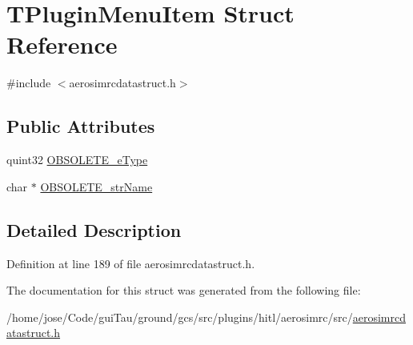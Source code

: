 \hypertarget{struct_t_plugin_menu_item}{\section{T\-Plugin\-Menu\-Item Struct Reference}
\label{struct_t_plugin_menu_item}
}


{\ttfamily \#include $<$aerosimrcdatastruct.\-h$>$}

\subsection*{Public Attributes}
\begin{DoxyCompactItemize}
\item 
quint32 \hyperlink{group___aero_sim_r_c_ga3182cdcc989c86e02f89dfc950a2d11e}{O\-B\-S\-O\-L\-E\-T\-E\-\_\-e\-Type}
\item 
char $\ast$ \hyperlink{group___aero_sim_r_c_ga99ed050ca0dfe8088a93046f72c044e7}{O\-B\-S\-O\-L\-E\-T\-E\-\_\-str\-Name}
\end{DoxyCompactItemize}


\subsection{Detailed Description}


Definition at line 189 of file aerosimrcdatastruct.\-h.



The documentation for this struct was generated from the following file\-:\begin{DoxyCompactItemize}
\item 
/home/jose/\-Code/gui\-Tau/ground/gcs/src/plugins/hitl/aerosimrc/src/\hyperlink{aerosimrcdatastruct_8h}{aerosimrcdatastruct.\-h}\end{DoxyCompactItemize}

